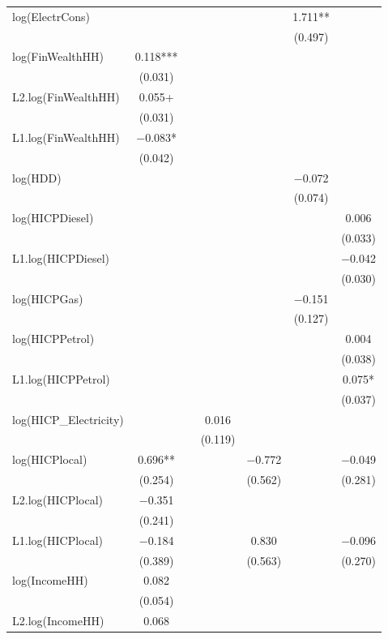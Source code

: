 \begin{table}
{\begin{tabular}[t]{lcccccc}
log(ElectrCons) &  &  &  &  & \num{1.711}** & \\
 &  &  &  &  & (\num{0.497}) & \\
log(FinWealthHH) & \num{0.118}*** &  &  &  &  & \\
 & (\num{0.031}) &  &  &  &  \vphantom{1} & \\
L2.log(FinWealthHH) & \num{0.055}+ &  &  &  &  & \\
 & (\num{0.031}) &  &  &  &  & \\
L1.log(FinWealthHH) & \num{-0.083}* &  &  &  &  & \\
 & (\num{0.042}) &  &  &  &  & \\
log(HDD) &  &  &  &  & \num{-0.072} & \\
 &  &  &  &  & (\num{0.074}) & \\
log(HICPDiesel) &  &  &  &  &  & \num{0.006}\\
 &  &  &  &  &  & (\num{0.033})\\
L1.log(HICPDiesel) &  &  &  &  &  & \num{-0.042}\\
 &  &  &  &  &  & (\num{0.030})\\
log(HICPGas) &  &  &  &  & \num{-0.151} & \\
 &  &  &  &  & (\num{0.127}) & \\
log(HICPPetrol) &  &  &  &  &  & \num{0.004}\\
 &  &  &  &  &  & (\num{0.038})\\
L1.log(HICPPetrol) &  &  &  &  &  & \num{0.075}*\\
 &  &  &  &  &  & (\num{0.037})\\
log(HICP\_Electricity) &  &  & \num{0.016} &  &  & \\
 &  &  & (\num{0.119}) &  &  & \\
log(HICPlocal) & \num{0.696}** &  &  & \num{-0.772} &  & \num{-0.049}\\
 & (\num{0.254}) &  &  & (\num{0.562}) &  & (\num{0.281})\\
L2.log(HICPlocal) & \num{-0.351} &  &  &  &  & \\
 & (\num{0.241}) &  &  &  &  & \\
L1.log(HICPlocal) & \num{-0.184} &  &  & \num{0.830} &  & \num{-0.096}\\
 & (\num{0.389}) &  &  & (\num{0.563}) &  & (\num{0.270})\\
log(IncomeHH) & \num{0.082} &  &  &  &  & \\
 & (\num{0.054}) &  &  &  &  & \\
L2.log(IncomeHH) & \num{0.068} &  &  &  &  & \\

\end{tabular}}
\end{table}
